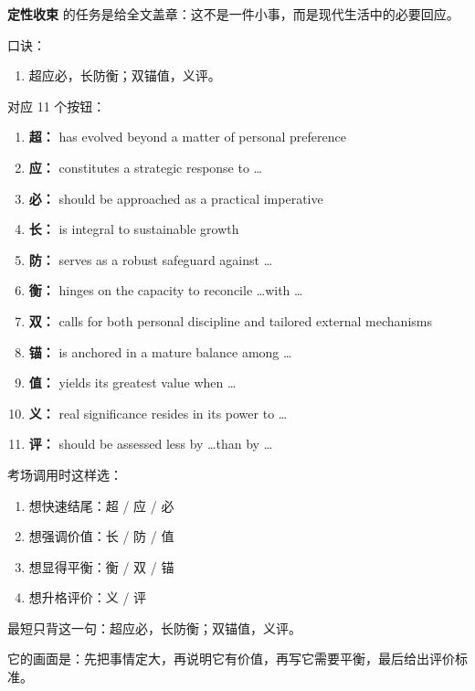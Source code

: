 ﻿\documentclass[lang=cn,11pt]{elegantbook}
\begin{document}
\begin{note}
\textbf{定性收束} 的任务是给全文盖章：这不是一件小事，而是现代生活中的必要回应。

口诀：

\begin{enumerate}
  \item 超应必，长防衡；双锚值，义评。
\end{enumerate}

对应 11 个按钮：

\begin{enumerate}
  \item \textbf{超：} has evolved beyond a matter of personal preference
  \item \textbf{应：} constitutes a strategic response to \ldots
  \item \textbf{必：} should be approached as a practical imperative
  \item \textbf{长：} is integral to sustainable growth
  \item \textbf{防：} serves as a robust safeguard against \ldots
  \item \textbf{衡：} hinges on the capacity to reconcile \ldots with \ldots
  \item \textbf{双：} calls for both personal discipline and tailored external mechanisms
  \item \textbf{锚：} is anchored in a mature balance among \ldots
  \item \textbf{值：} yields its greatest value when \ldots
  \item \textbf{义：} real significance resides in its power to \ldots
  \item \textbf{评：} should be assessed less by \ldots than by \ldots
\end{enumerate}

考场调用时这样选：

\begin{enumerate}
  \item 想快速结尾：超 / 应 / 必
  \item 想强调价值：长 / 防 / 值
  \item 想显得平衡：衡 / 双 / 锚
  \item 想升格评价：义 / 评
\end{enumerate}

最短只背这一句：超应必，长防衡；双锚值，义评。

它的画面是：先把事情定大，再说明它有价值，再写它需要平衡，最后给出评价标准。
\end{note}
\end{document}
